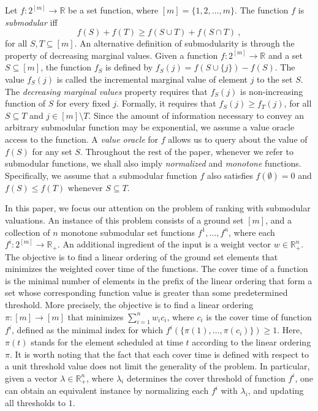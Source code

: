 \documentclass[11pt]{article}
\theoremstyle{plain}
\theoremstyle{definition}
\newcommand{\bbR}{\mathbb{R}}
\begin{document}
Let $f: 2^{[m]} \rightarrow \bbR$ be a set function, where $[m] =
\{1, 2, \ldots, m\}$. The function $f$ is \emph{submodular} iff
$$
f(S) + f(T) \geq f(S \cup T) + f(S \cap T) \ ,
$$
for all $S, T \subseteq [m]$. An alternative definition of
submodularity is through the property of decreasing marginal
values. Given a function $f: 2^{[m]} \rightarrow \bbR$ and a set
$S \subseteq [m]$, the function $f_S$ is defined by $f_S(j) = f(S
\cup \{j\}) - f(S)$. The value $f_S(j)$ is called the incremental
marginal value of element $j$ to the set $S$. The \emph{decreasing
marginal values} property requires that $f_S(j)$ is non-increasing
function of $S$ for every fixed $j$. Formally, it requires that
$f_S(j) \geq f_T(j)$, for all $S \subseteq T$ and $j \in [m]
\setminus T$. Since the amount of information necessary to convey
an arbitrary submodular function may be exponential, we assume a
value oracle access to the function. A \emph{value oracle} for $f$
allows us to query about the value of $f(S)$ for any set $S$.
Throughout the rest of the paper, whenever we refer to submodular
functions, we shall also imply \emph{normalized} and
\emph{monotone} functions. Specifically, we assume that a
submodular function $f$ also satisfies $f(\emptyset) = 0$ and
$f(S) \leq f(T)$ whenever $S \subseteq T$.

In this paper, we focus our attention on the problem of ranking
with submodular valuations. An instance of this problem consists
of a ground set $[m]$, and a collection of $n$ monotone submodular
set functions $f^1, \ldots, f^n$, where each $f^i: 2^{[m]} \to
\bbR_+$. An additional ingredient of the input is a weight vector
$w \in \bbR_+^n$. The objective is to find a linear ordering of
the ground set elements that minimizes the weighted cover time of
the functions. The cover time of a function is the minimal number
of elements in the prefix of the linear ordering that form a set
whose corresponding function value is greater than some
predetermined threshold. More precisely, the objective is to find
a linear ordering $\pi: [m] \to [m]$ that minimizes $\sum_{i =
1}^{n} w_i c_i$, where $c_i$ is the cover time of function $f^i$,
defined as the minimal index for which $f^i( \{ \pi(1), \ldots,
\pi(c_i) \}) \geq 1$. Here, $\pi(t)$ stands for the element
scheduled at time $t$ according to the linear ordering $\pi$. It
is worth noting that the fact that each cover time is defined with
respect to a unit threshold value does not limit the generality of
the problem. In particular, given a vector $\lambda \in \bbR_+^n$,
where $\lambda_i$ determines the cover threshold of function
$f^i$, one can obtain an equivalent instance by normalizing each
$f^i$ with $\lambda_i$, and updating all thresholds to $1$.
\end{document}
